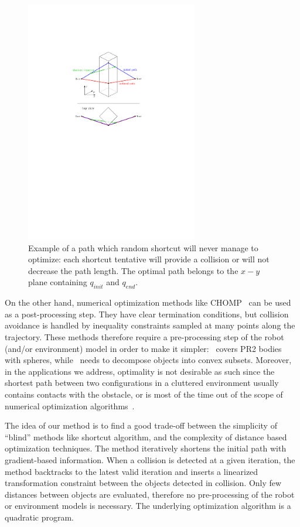 \documentclass{tADR2e}
\begin{document}
\begin{figure}[H]
	\centering
	\includegraphics[width=7.5cm]{decoupled_DOF_optimization.pdf}
	\caption{Example of a path which random shortcut will never manage to 
	optimize: each shortcut tentative will provide a collision or will not 
	decrease the path length. The optimal path belongs to the $x-y$ plane 
	containing $q_{init}$ and $q_{end}$.}
	\label{decoupled_DOF_optimization}
\end{figure}


On the other hand, numerical
optimization methods like CHOMP~\cite{RatliffChomp} can be used as a
post-processing step. They have clear termination conditions, but collision
avoidance is handled by inequality constraints sampled at many points along
the trajectory. These methods therefore require a pre-processing step of the
robot (and/or environment) model in order to make 
it simpler:~\cite{RatliffChomp} covers PR2 bodies with spheres, 
while~\cite{convexOptimMotplan} needs to decompose objects into convex subsets.
Moreover, in the applications we address, optimality is not desirable as
such since the shortest path between two configurations in a cluttered
environment usually contains contacts with the obstacle,
or is most of the time
out of the scope of numerical optimization algorithms~\cite{LaumondOptim}.

The idea of our method is to find a good trade-off between
the simplicity of “blind” methods like shortcut algorithm,
and the complexity of distance based optimization techniques.
The method iteratively shortens the initial path with gradient-based information.
When a collision is detected at a given iteration, the method backtracks to the
latest valid iteration and inserts a linearized transformation constraint
between the objects detected in collision. Only few distances between objects are evaluated, therefore no pre-processing of the
robot or environment models is necessary. The underlying optimization
algorithm is a quadratic program.
\end{document}

